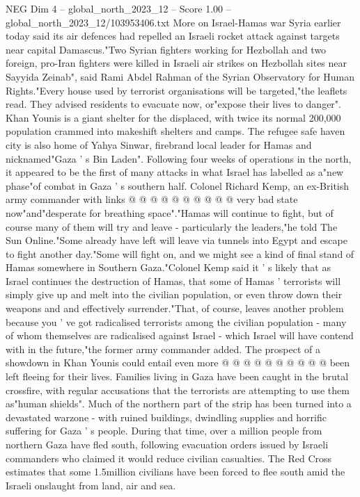 \begin{textsample}{NEG Dim 4 – global\_north\_2023\_12 – Score 1.00 – global\_north\_2023\_12/103953406.txt}  \label{ex:f4_neg_156}
More on Israel-Hamas war Syria earlier today said its air defences had repelled an Israeli rocket attack against targets near capital Damascus."Two Syrian fighters working for Hezbollah and two foreign, pro-Iran fighters were killed in Israeli air strikes on Hezbollah sites near Sayyida Zeinab", said Rami Abdel Rahman of the Syrian Observatory for Human Rights."Every house used by terrorist organisations will be targeted,"the leaflets read.
They advised residents to evacuate now, or"expose their lives to danger".
Khan Younis is a giant shelter for the displaced, with twice its normal 200,000 population crammed into makeshift shelters and camps.
The refugee safe haven city is also home of Yahya Sinwar, firebrand local leader for Hamas and nicknamed"Gaza ' s Bin Laden".
Following four weeks of operations in the north, it appeared to be the first of many attacks in what Israel has labelled as a"new phase"of combat in Gaza ' s southern half.
Colonel Richard Kemp, an ex-British army commander with links @ @ @ @ @ @ @ @ @ @ very bad state now"and"desperate for breathing space"."Hamas will continue to fight, but of course many of them will try and leave - particularly the leaders,"he told The Sun Online."Some already have left will leave via tunnels into Egypt and escape to fight another day."Some will fight on, and we might see a kind of final stand of Hamas somewhere in Southern Gaza."Colonel Kemp said it ' s likely that as Israel continues the destruction of Hamas, that some of Hamas ' terrorists will simply give up and melt into the civilian population, or even throw down their weapons and and effectively surrender."That, of course, leaves another problem because you ' ve got radicalised terrorists among the civilian population - many of whom themselves are radicalised against Israel - which Israel will have contend with in the future,"the former army commander added.
The prospect of a showdown in Khan Younis could entail even more @ @ @ @ @ @ @ @ @ @ been left fleeing for their lives.
Families living in Gaza have been caught in the brutal crossfire, with regular accusations that the terrorists are attempting to use them as"human shields".
Much of the northern part of the strip has been turned into a devastated warzone - with ruined buildings, dwindling supplies and horrific suffering for Gaza ' s people.
During that time, over a million people from northern Gaza have fled south, following evacuation orders issued by Israeli commanders who claimed it would reduce civilian casualties.
The Red Cross estimates that some 1.5million civilians have been forced to flee south amid the Israeli onslaught from land, air and sea.

\end{textsample}
